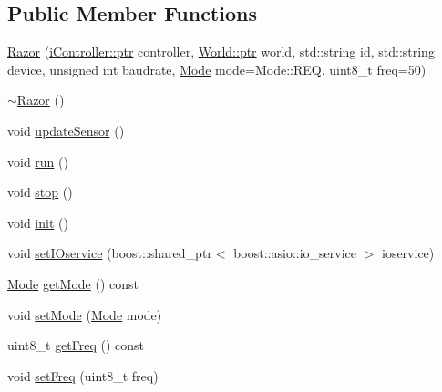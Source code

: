 \subsection*{Public Member Functions}
\begin{DoxyCompactItemize}
\item 
\hyperlink{classo_cpt_1_1components_1_1sensors_1_1_razor_aad2e22f7bc7227be565cab124d471a40}{Razor} (\hyperlink{classo_cpt_1_1i_controller_a6d89a95cd6ad68bb74adfaca2f36370f}{i\+Controller\+::ptr} controller, \hyperlink{classo_cpt_1_1_world_aa6e591e3096d5de71e0cec9039663d67}{World\+::ptr} world, std\+::string id, std\+::string device, unsigned int baudrate, \hyperlink{classo_cpt_1_1components_1_1sensors_1_1_razor_afed258e485aaaf9193a57d649ccb159b}{Mode} mode=Mode\+::\+R\+EQ, uint8\+\_\+t freq=50)
\item 
\hyperlink{classo_cpt_1_1components_1_1sensors_1_1_razor_ae77b23479f6e7b52ed25c9989a0f1903}{$\sim$\+Razor} ()
\item 
void \hyperlink{classo_cpt_1_1components_1_1sensors_1_1_razor_ac8ee1582eb5c478c73e5e050858d2d7d}{update\+Sensor} ()
\item 
void \hyperlink{classo_cpt_1_1components_1_1sensors_1_1_razor_ad93891ffb2d47e56d1417f0a40026c6e}{run} ()
\item 
void \hyperlink{classo_cpt_1_1components_1_1sensors_1_1_razor_a807441c137892ee3c1b612c284893fa1}{stop} ()
\item 
void \hyperlink{classo_cpt_1_1components_1_1sensors_1_1_razor_a1dd2b5a9fbac3c9510e2d3771abf358b}{init} ()
\item 
void \hyperlink{classo_cpt_1_1components_1_1sensors_1_1_razor_a0f251fe3b51bf1a96b5d1e14e69a6d57}{set\+I\+Oservice} (boost\+::shared\+\_\+ptr$<$ boost\+::asio\+::io\+\_\+service $>$ ioservice)
\item 
\hyperlink{classo_cpt_1_1components_1_1sensors_1_1_razor_afed258e485aaaf9193a57d649ccb159b}{Mode} \hyperlink{classo_cpt_1_1components_1_1sensors_1_1_razor_ae9d8191555b521ee02cc26e387c900b1}{get\+Mode} () const
\item 
void \hyperlink{classo_cpt_1_1components_1_1sensors_1_1_razor_a25a3159510e0b725eaf817b8775420ac}{set\+Mode} (\hyperlink{classo_cpt_1_1components_1_1sensors_1_1_razor_afed258e485aaaf9193a57d649ccb159b}{Mode} mode)
\item 
uint8\+\_\+t \hyperlink{classo_cpt_1_1components_1_1sensors_1_1_razor_aefaf1327348e3e3b9717c40d7aa741c2}{get\+Freq} () const
\item 
void \hyperlink{classo_cpt_1_1components_1_1sensors_1_1_razor_a77cdeb877826fce3a12fec0ed3035478}{set\+Freq} (uint8\+\_\+t freq)
\end{DoxyCompactItemize}
